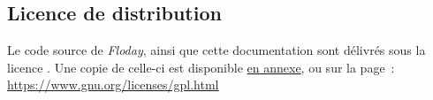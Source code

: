 \subsection{Licence de distribution}

Le code source de \emph{Floday}, ainsi que cette documentation sont délivrés sous la licence .
Une copie de celle-ci est disponible \hyperref[sec:gpl]{en annexe}, ou sur la page~: \url{https://www.gnu.org/licenses/gpl.html}
